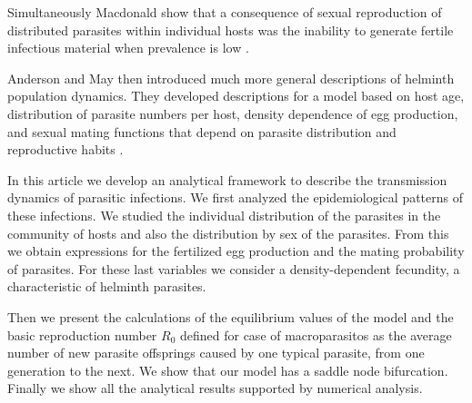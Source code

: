 \documentclass[12pt,a4paper]{article}
\theoremstyle{plain}%
\theoremstyle{definition}
\theoremstyle{remark}
\begin{document}
 	
 	Simultaneously Macdonald show that a consequence of sexual reproduction of distributed parasites within individual hosts was the inability to generate fertile infectious material when prevalence is low \cite{macdonald1965dynamics}.
 	
 	
 	
 	Anderson and May then introduced much more general descriptions of helminth population dynamics. They developed descriptions for a model based on host age, distribution of parasite numbers per host, density dependence of egg production, and sexual mating functions that depend on parasite distribution and reproductive habits \cite{anderson1982population,anderson1992infectious}.
 	
 	In this article we develop an analytical framework to describe the transmission dynamics of parasitic infections. We first analyzed the epidemiological patterns of these infections. We studied the individual distribution of the parasites in the community of hosts and also the distribution by sex of the parasites. From this we obtain expressions for the fertilized egg production and the mating probability of parasites. For these last variables we consider a density-dependent fecundity, a characteristic of helminth parasites. 
 	
 	Then we present the calculations of the equilibrium values of the model and 
 	the basic reproduction number $R_0$ defined for case of macroparasitos as the average number of new parasite offsprings caused by one typical parasite, from one generation to the next. 
 	We show that our model has a saddle node bifurcation.
 	Finally we show all the analytical results supported by numerical analysis.
 	
\end{document}
